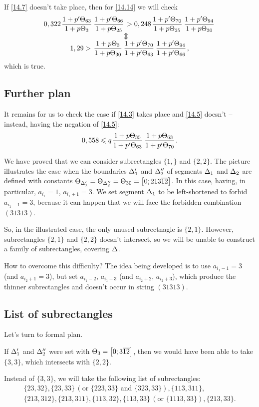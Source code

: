 If \ref{14.7} doesn't take place, then for \ref{14.14} we will check
\begin{gather*}
	0,322 \pu{63}{3} \pu{66}{25} > 0,248 \pu{70}{25} \pu{94}{30}\\
	\ArrowBetweenLines
	1,29 > \uu{3}{30} \pp{70}{63} \pp{94}{66},
\end{gather*}
which is true.

\subsection{Further plan}

It remains for us to check the case if \ref{14.3} takes place and \ref{14.5} doesn't --
instead, having the negation of \ref{14.5}:
\begin{equation}\label{14.15}
	0,558 \leqslant q \up{35}{63} \up{63}{70}.
\end{equation}

We have proved that we can consider subrectangles $\{1,\}$ and $\{2, 2\}$.
The picture illustrates the case when
the boundaries $\Delta_1'$ and $\Delta_2''$ of segments $\Delta_1$ and $\Delta_2$ are defined
with constants $\Theta_{\Delta_1'} = \Theta_{\Delta_2''} = \Theta_{30} = \left[0; 213\overline{12}\right]$.
In this case, having, in particular, $a_{i_1} = 1$, $a_{i_1 + 1} = 3$.
We set segment $\Delta_1$ to be left-shortened to forbid $a_{i_1 - 1} = 3$,
because it can happen that we will face the forbidden combination $(31313)$.

So, in the illustrated case, the only unused subrectnagle is $\{2, 1\}$.
However, subrectangles $\{2, 1\}$ and $\{2, 2\}$ doesn't intersect,
so we will be unable to construct a family of subrectangles, covering $\Delta$.

How to overcome this difficulty?
The idea being developed is to use $a_{i_1 - 1} = 3$ (and $a_{i_2 + 1} = 3$),
but set $a_{i_1 - 2},\, a_{i_1 - 3}$ (and $a_{i_2 + 2},\, a_{i_2 + 3}$),
which produce the thinner subrectangles and doesn't occur in string $(31313)$.

\subsection{List of subrectangles}

Let's turn to formal plan.

If $\Delta_1'$ and $\Delta_2''$ were set with $\Theta_{3} = \left[0; 3\overline{12}\right]$,
then we would have been able to take $\{3, 3\}$, which intersects with $\{2, 2\}$.

Instead of $\{3, 3\}$, we will take the following list of subrectangles:
\begin{gather*}
	\{23, 32\}, \{23, 33\} \,(\text{or } \{223, 33\} \text{ and } \{323, 33\}), \{113, 311\},\\
	\{213, 312\}, \{213, 311\}, \{113, 32\}, \{113, 33\} \,(\text{or } \{1113, 33\}), \{213, 33\}.
\end{gather*}

